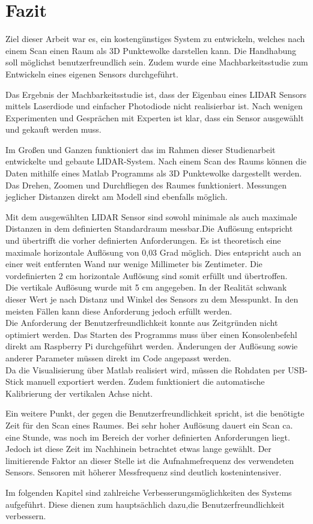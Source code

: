 \chapter{Fazit}\label{chap:fazit}

Ziel dieser Arbeit war es, ein kostengünstiges System zu entwickeln, welches nach einem Scan einen Raum als 3D Punktewolke darstellen kann. Die Handhabung soll möglichst benutzerfreundlich sein. Zudem wurde eine Machbarkeitsstudie zum Entwickeln eines eigenen Sensors durchgeführt.

Das Ergebnis der Machbarkeitsstudie ist, dass der Eigenbau eines \ac{LIDAR} Sensors mittels Laserdiode und einfacher Photodiode nicht realisierbar ist. Nach wenigen Experimenten und Gesprächen mit Experten ist klar, dass ein Sensor ausgewählt und gekauft werden muss.

Im Großen und Ganzen funktioniert das im Rahmen dieser Studienarbeit entwickelte und gebaute \ac{LIDAR}-System. Nach einem Scan des Raums können die Daten mithilfe eines Matlab Programms als 3D Punktewolke dargestellt werden. Das Drehen, Zoomen und Durchfliegen des Raumes funktioniert. Messungen jeglicher Distanzen direkt am Modell sind ebenfalls möglich.

Mit dem ausgewählten \ac{LIDAR} Sensor sind sowohl minimale als auch maximale Distanzen in dem definierten Standardraum messbar.Die Auflösung entspricht und übertrifft die vorher definierten Anforderungen. Es ist theoretisch eine maximale horizontale Auflösung von 0,03 Grad möglich. Dies entspricht auch an einer weit entfernten Wand nur wenige Millimeter bis Zentimeter. Die vordefinierten 2 cm horizontale Auflösung sind somit erfüllt und übertroffen. \\
Die vertikale Auflösung wurde mit 5 cm angegeben. In der Realität schwank dieser Wert je nach Distanz und Winkel des Sensors zu dem Messpunkt. In den meisten Fällen kann diese Anforderung jedoch erfüllt werden. \\
 
Die Anforderung der Benutzerfreundlichkeit konnte aus Zeitgründen nicht optimiert werden. Das Starten des Programms muss über einen Konsolenbefehl direkt am Raspberry Pi durchgeführt werden. Änderungen der Auflösung sowie anderer Parameter müssen direkt im Code angepasst werden.\\
Da die Visualisierung über Matlab realisiert wird, müssen die Rohdaten per USB-Stick manuell exportiert werden. Zudem funktioniert die automatische Kalibrierung der vertikalen Achse nicht.

Ein weitere Punkt, der gegen die Benutzerfreundlichkeit spricht, ist die benötigte Zeit für den Scan eines Raumes. Bei sehr hoher Auflösung dauert ein Scan ca. eine Stunde, was noch im Bereich der vorher definierten Anforderungen liegt. Jedoch ist diese Zeit im Nachhinein betrachtet etwas lange gewählt. Der limitierende Faktor an dieser Stelle ist die Aufnahmefrequenz des verwendeten Sensors. Sensoren mit höherer Messfrequenz sind deutlich kostenintensiver.

Im folgenden Kapitel sind zahlreiche Verbesserungsmöglichkeiten des Systems aufgeführt. Diese dienen zum hauptsächlich dazu,die Benutzerfreundlichkeit verbessern.

